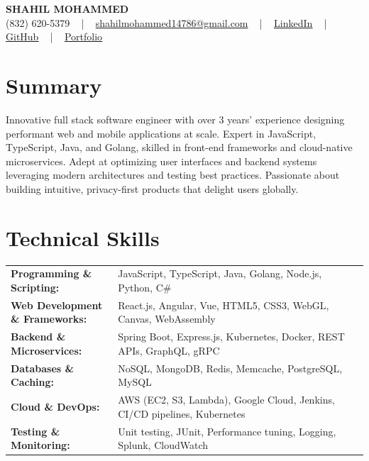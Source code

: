 \documentclass[letterpaper,11pt]{article}
\begin{document}
\begin{center}
    {\fontsize{14pt}{12pt}\selectfont \textbf{\MakeUppercase{Shahil Mohammed}}}\\ \vspace{2pt}
    \fontsize{10pt}{12pt}\selectfont (832) 620-5379 ~ | ~ \href{mailto:shahilmohammed14786@gmail.com}{shahilmohammed14786@gmail.com} ~ | ~  
    \href{https://www.linkedin.com/in/shahil-mohammed-9652931a1/}{\color{blue}\underline{LinkedIn}}  ~ | ~ 
    \href{https://github.com/freakbeast14}{\color{blue}\underline{GitHub}} ~ | ~ 
    \href{https://shahil-mohammed.netlify.app/}{\color{blue}\underline{Portfolio}}
    \vspace{-8pt}
\end{center}

\section{Summary}
\fontsize{9pt}{10pt}\selectfont
Innovative full stack software engineer with over 3 years’ experience designing performant web and mobile applications at scale. Expert in JavaScript, TypeScript, Java, and Golang, skilled in front-end frameworks and cloud-native microservices. Adept at optimizing user interfaces and backend systems leveraging modern architectures and testing best practices. Passionate about building intuitive, privacy-first products that delight users globally.
 \vspace{-5pt}
 
\section{Technical Skills}
        \vspace{-14pt}
        \begin{table}[h]
            \fontsize{9pt}{10pt}\selectfont
            \begin{tabular}{p{0.3\linewidth} p{0.7\linewidth}}
                \textbf{Programming \& Scripting:} & JavaScript, TypeScript, Java, Golang, Node.js, Python, C\# \\
                \textbf{Web Development \& Frameworks:} & React.js, Angular, Vue, HTML5, CSS3, WebGL, Canvas, WebAssembly \\
                \textbf{Backend \& Microservices:} & Spring Boot, Express.js, Kubernetes, Docker, REST APIs, GraphQL, gRPC \\
                \textbf{Databases \& Caching:} & NoSQL, MongoDB, Redis, Memcache, PostgreSQL, MySQL \\
                \textbf{Cloud \& DevOps:} & AWS (EC2, S3, Lambda), Google Cloud, Jenkins, CI/CD pipelines, Kubernetes \\
                \textbf{Testing \& Monitoring:} & Unit testing, JUnit, Performance tuning, Logging, Splunk, CloudWatch \\
            \end{tabular}
        \end{table}
 \vspace{-15pt}
 
\end{document}
